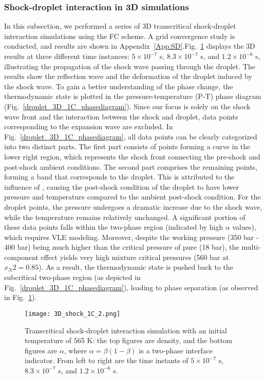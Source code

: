 
\subsubsection{Shock-droplet interaction in 3D simulations}
\label{sec:SD_3D}

In this subsection, we performed a series of 3D transcritical shock-droplet interaction simulations using the FC scheme. A grid convergence study is conducted, and results are shown in Appendix~\ref{App:SD}.Fig.~\ref{droplet_3d_1C} displays the 3D results at three different time instances: $5\times 10^{-7}$ s, $8.3\times 10^{-7}$ s, and $1.2\times 10^{-6}$ s, illustrating the propagation of the shock wave passing through the droplet. The results show the reflection wave and the deformation of the droplet induced by the shock wave. To gain a better understanding of the phase change, the thermodynamic state is plotted in the pressure-temperature (P-T) phase diagram (Fig.~\ref{droplet_3D_1C_phasediagram}). Since our focus is solely on the shock wave front and the interaction between the shock and droplet, data points corresponding to the expansion wave are excluded. In Fig.~\ref{droplet_3D_1C_phasediagram}, all data points can be clearly categorized into two distinct parts. The first part consists of points forming a curve in the lower right region, which represents the shock front connecting the pre-shock and post-shock ambient conditions. The second part comprises the remaining points, forming a band that corresponds to the droplet. This is attributed to the influence of , causing the post-shock condition of the droplet to have lower pressure and temperature compared to the ambient post-shock condition. For the droplet points, the pressure undergoes a dramatic increase due to the shock wave, while the temperature remains relatively unchanged. A significant portion of these data points falls within the two-phase region (indicated by high $\alpha$ values), which requires VLE modeling. Moreover, despite the working pressure (350 bar - 400 bar) being much higher than the critical pressure of pure  (18 bar), the multi-component effect yields very high mixture critical pressures (560 bar at $x_N2 = 0.85$). As a result, the thermodynamic state is pushed back to the subcritical two-phase region (as depicted in Fig.~\ref{droplet_3D_1C_phasediagram}), leading to phase separation (as observed in Fig.~\ref{droplet_3d_1C}).

\begin{figure}[htbp]
\centering
\texttt{[image: 3D\_shock\_1C\_2.png]}
\caption{Transcritical shock-droplet interaction simulation with an initial temperature of 565 K: the top figures are density, and the bottom figures are $\alpha$, where $\alpha = \beta (1-\beta)$ is a two-phase interface indicator. From left to right are the time instants of $5\times 10^{-7}$ s, $8.3\times 10^{-7}$ s, and $1.2\times 10^{-6}$ s. }
\label{droplet_3d_1C} 
\end{figure}


